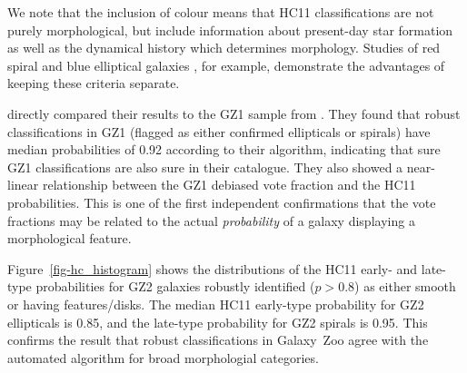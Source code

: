 \documentclass[useAMS,usenatbib]{mn2e}
\begin{document}
We note that the inclusion of colour means that HC11 classifications are not purely morphological, but include information about present-day star formation as well as the dynamical history which determines morphology. Studies of red spiral \citep{mas10a} and blue elliptical galaxies \citep{sch09}, for example, demonstrate the advantages of keeping these criteria separate. 

\citet{hue11} directly compared their results to the GZ1 sample from \citet{lin11}. They found that robust classifications in GZ1 (flagged as either confirmed ellipticals or spirals) have median probabilities of 0.92 according to their algorithm, indicating that sure GZ1 classifications are also sure in their catalogue. They also showed a near-linear relationship between the GZ1 debiased vote fraction and the HC11 probabilities. This is one of the first independent confirmations that the vote fractions may be related to the actual {\em probability} of a galaxy displaying a morphological feature. 


Figure~\ref{fig-hc_histogram} shows the distributions of the HC11 early- and late-type probabilities for GZ2 galaxies robustly identified ($p>0.8$) as either smooth or having features/disks. The median HC11 early-type probability for GZ2 ellipticals is 0.85, and the late-type probability for GZ2 spirals is 0.95. This confirms the result that robust classifications in Galaxy~Zoo agree with the automated algorithm for broad morphologial categories. 
\end{document}
